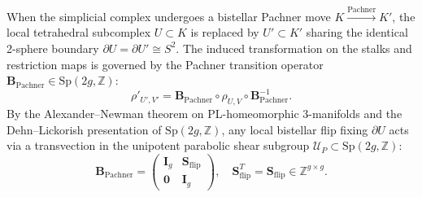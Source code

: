 \documentclass[11pt,onecolumn]{article}
\begin{document}
When the simplicial complex undergoes a bistellar Pachner move $K \xrightarrow{\mathrm{Pachner}} K'$, the local tetrahedral subcomplex $U \subset K$ is replaced by $U' \subset K'$ sharing the identical 2-sphere boundary $\partial U = \partial U' \cong S^2$. The induced transformation on the stalks and restriction maps is governed by the Pachner transition operator $\mathbf{B}_{\mathrm{Pachner}} \in \mathrm{Sp}(2g, \mathbb{Z})$:
\begin{equation}
\rho'_{U',V'} = \mathbf{B}_{\mathrm{Pachner}} \circ \rho_{U,V} \circ \mathbf{B}_{\mathrm{Pachner}}^{-1}.
\end{equation}
By the Alexander--Newman theorem on PL-homeomorphic 3-manifolds and the Dehn--Lickorish presentation of $\mathrm{Sp}(2g, \mathbb{Z})$, any local bistellar flip fixing $\partial U$ acts via a transvection in the unipotent parabolic shear subgroup $\mathcal{U}_P \subset \mathrm{Sp}(2g, \mathbb{Z})$:
\begin{equation}
\mathbf{B}_{\mathrm{Pachner}} = \begin{pmatrix} \mathbf{I}_g & \mathbf{S}_{\mathrm{flip}} \\ \mathbf{0} & \mathbf{I}_g \end{pmatrix}, \quad \mathbf{S}_{\mathrm{flip}}^T = \mathbf{S}_{\mathrm{flip}} \in \mathbb{Z}^{g \times g}.
\end{equation}
\end{document}
